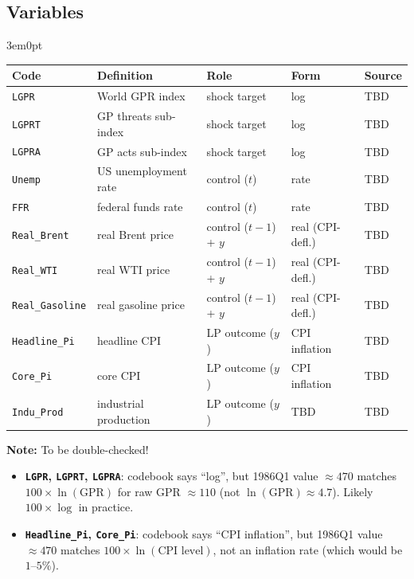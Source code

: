 \documentclass[12pt]{article}
\newenvironment{bodyL2}{\begin{adjustwidth}{3em}{0pt}}{\end{adjustwidth}}
\begin{document}
\subsection{Variables}
\begin{bodyL2}
\begin{center}
\renewcommand{\arraystretch}{1.15}
\begin{tabular}{lllll}
\toprule
Code & Definition & Role & Form & Source \\
\midrule
\texttt{LGPR}             & World GPR index           & shock target           & log               & TBD \\
\texttt{LGPRT}            & GP threats sub-index      & shock target           & log               & TBD \\
\texttt{LGPRA}            & GP acts sub-index         & shock target           & log               & TBD \\
\midrule
\texttt{Unemp}            & US unemployment rate      & control ($t$)          & rate              & TBD \\
\texttt{FFR}              & federal funds rate        & control ($t$)          & rate              & TBD \\
\midrule
\texttt{Real\_Brent}      & real Brent price          & control ($t{-}1$) + $y$ & real (CPI-defl.)  & TBD \\
\texttt{Real\_WTI}        & real WTI price            & control ($t{-}1$) + $y$ & real (CPI-defl.)  & TBD \\
\texttt{Real\_Gasoline}   & real gasoline price       & control ($t{-}1$) + $y$ & real (CPI-defl.)  & TBD \\
\midrule
\texttt{Headline\_Pi}     & headline CPI              & LP outcome ($y$)       & CPI inflation     & TBD \\
\texttt{Core\_Pi}         & core CPI                  & LP outcome ($y$)       & CPI inflation     & TBD \\
\texttt{Indu\_Prod}       & industrial production     & LP outcome ($y$)       & TBD               & TBD \\
\bottomrule
\end{tabular}
\end{center}

\bigskip
\textbf{Note:} To be double-checked!
\begin{itemize}
    \item[--] \textbf{\texttt{LGPR}, \texttt{LGPRT}, \texttt{LGPRA}}: codebook says
          ``log'', but 1986Q1 value $\approx 470$ matches $100 \times \ln(\text{GPR})$ for raw GPR $\approx 110$ (not $\ln(\text{GPR}) \approx 4.7$).
          Likely $100 \times \log$ in practice.
    \item[--] \textbf{\texttt{Headline\_Pi}, \texttt{Core\_Pi}}: codebook says
          ``CPI inflation'', but 1986Q1 value $\approx 470$ matches $100 \times \ln(\text{CPI level})$, not an inflation rate (which would be $1$--$5\%$).
\end{itemize}
\end{bodyL2}
\end{document}

